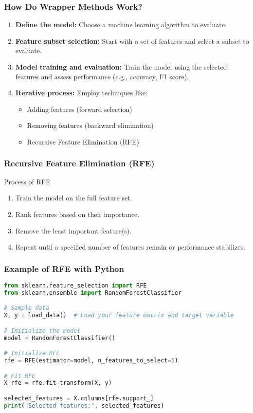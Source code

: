 \documentclass[aspectratio=169]{beamer}
\begin{document}
\begin{frame}[fragile]
    \frametitle{How Do Wrapper Methods Work?}
    \begin{enumerate}
        \item \textbf{Define the model:} Choose a machine learning algorithm to evaluate.
        \item \textbf{Feature subset selection:} Start with a set of features and select a subset to evaluate.
        \item \textbf{Model training and evaluation:} Train the model using the selected features and assess performance (e.g., accuracy, F1 score).
        \item \textbf{Iterative process:} Employ techniques like:
        \begin{itemize}
            \item Adding features (forward selection)
            \item Removing features (backward elimination)
            \item Recursive Feature Elimination (RFE)
        \end{itemize}
    \end{enumerate}
\end{frame}

\begin{frame}[fragile]
    \frametitle{Recursive Feature Elimination (RFE)}
    \begin{block}{Process of RFE}
        \begin{enumerate}
            \item Train the model on the full feature set.
            \item Rank features based on their importance.
            \item Remove the least important feature(s).
            \item Repeat until a specified number of features remain or performance stabilizes.
        \end{enumerate}
    \end{block}
\end{frame}

\begin{frame}[fragile]
    \frametitle{Example of RFE with Python}
    \begin{lstlisting}[language=Python]
from sklearn.feature_selection import RFE
from sklearn.ensemble import RandomForestClassifier

# Sample data
X, y = load_data()  # Load your feature matrix and target variable

# Initialize the model
model = RandomForestClassifier()

# Initialize RFE
rfe = RFE(estimator=model, n_features_to_select=5)

# Fit RFE
X_rfe = rfe.fit_transform(X, y)

selected_features = X.columns[rfe.support_]
print("Selected features:", selected_features)
    \end{lstlisting}
\end{frame}
\end{document}
